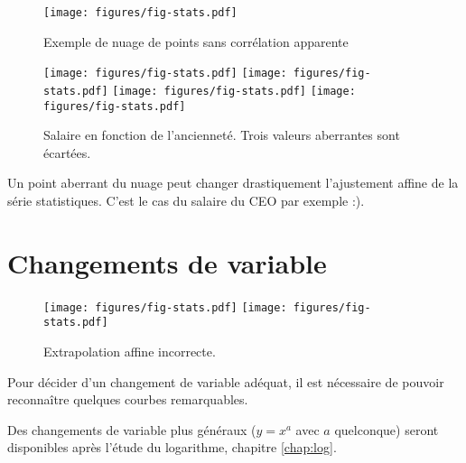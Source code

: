 \begin{figure}
	\centering
	\texttt{[image: figures/fig-stats.pdf]}
	\caption{Exemple de nuage de points sans corrélation apparente}
\end{figure}

\begin{figure}
	\centering
	\texttt{[image: figures/fig-stats.pdf]}
	\texttt{[image: figures/fig-stats.pdf]}
	\texttt{[image: figures/fig-stats.pdf]}
	\texttt{[image: figures/fig-stats.pdf]}
	\caption{Salaire en fonction de l'ancienneté. Trois valeurs aberrantes sont écartées.}
\end{figure}


Un point aberrant du nuage peut changer drastiquement l'ajustement affine de la série statistiques.
C'est le cas du salaire du CEO par exemple :).



\section{Changements de variable}


\begin{figure}
	\centering
	\texttt{[image: figures/fig-stats.pdf]}
	\texttt{[image: figures/fig-stats.pdf]}
	\caption{Extrapolation affine incorrecte.}
\end{figure}

Pour décider d'un changement de variable adéquat, il est nécessaire de pouvoir reconnaître quelques courbes remarquables.



Des changements de variable plus généraux ($y=x^a$ avec $a$ quelconque) seront disponibles après l'étude du logarithme, chapitre \ref{chap:log}.



